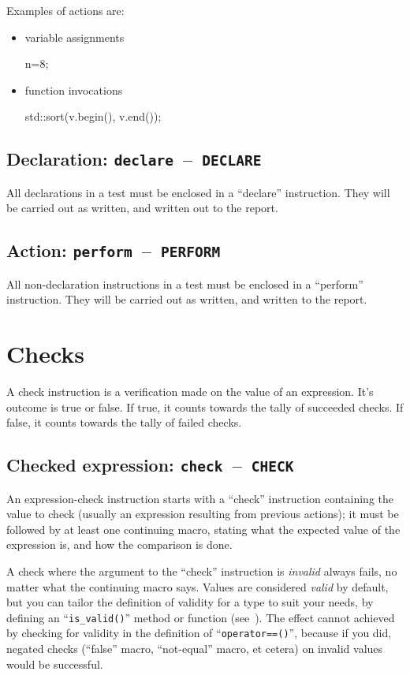 \documentclass[twoside, a4paper, article]{memoir}
\newcommand*\testudocolor{\color{red!80!blue}}
\newcommand*\testudo[1]{\texttt{\testudocolor{}#1}}
\newcommand*\testudopair[2]{\testudo{#1}~--~\testudo{#2}}
\newcommand\subsectiontestudopair[3]{%
  \subsection[#1]{#1: \testudopair{#2}{#3}}}
\providecommand\typesetexample[1]{%
}
\begin{document}
Examples of actions are:
\begin{itemize}
\item variable assignments
\begin{cpplisting}
n=8;
\end{cpplisting}

\item function invocations
\begin{cpplisting}
std::sort(v.begin(), v.end());
\end{cpplisting}
\end{itemize}

\subsectiontestudopair{Declaration}{declare}{DECLARE}
\label{sec:declaration}

All declarations in a test must be enclosed in a ``declare'' instruction.  They
will be carried out as written, and written out to the report.

\typesetexample{declare}

\subsectiontestudopair{Action}{perform}{PERFORM}
\label{sec:action}

All non-declaration instructions in a test must be enclosed in a ``perform''
instruction.  They will be carried out as written, and written to the report.

\typesetexample{perform}


\section{Checks}
\label{sec:checks}

A check instruction is a verification made on the value of an expression.  It's
outcome is true or false.  If true, it counts towards the tally of succeeded
checks.  If false, it counts towards the tally of failed checks.

\subsectiontestudopair{Checked expression}{check}{CHECK}
\label{sec:checked-expression}

An expression-check instruction starts with a ``check'' instruction containing
the value to check (usually an expression resulting from previous actions); it
must be followed by at least one continuing macro, stating what the expected
value of the expression is, and how the comparison is done.

A check where the argument to the ``check'' instruction is \emph{invalid}
always fails, no matter what the continuing macro says.  Values are considered
\emph{valid} by default, but you can tailor the definition of validity for a
type to suit your needs, by defining an ``\texttt{is\_valid()}'' method or
function (see~).  The effect cannot achieved by checking for
validity in the definition of ``\texttt{operator==()}'', because if you did,
negated checks (``false'' macro, ``not-equal'' macro, et cetera) on invalid
values would be successful.
\end{document}

